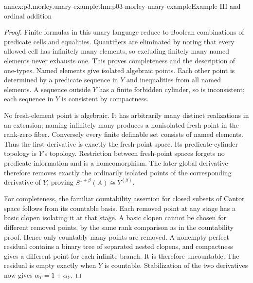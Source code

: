 \begin{annexitem}{annex:p3.morley.unary-example}{thm:p03-morley-unary-example}{Example III and ordinal addition}
\begin{proof}
Finite formulas in this unary language reduce to Boolean
combinations of predicate cells and equalities. Quantifiers
are eliminated by noting that every allowed cell has
infinitely many elements, so excluding finitely many
named elements never exhausts one. This proves completeness
and the description of one-types. Named elements give
isolated algebraic points. Each other point is determined
by a predicate sequence in \(Y\) and inequalities from
all named elements. A sequence outside \(Y\) has a
finite forbidden cylinder, so is inconsistent; each
sequence in \(Y\) is consistent by compactness.

No fresh-element point is algebraic. It has arbitrarily
many distinct realizations in an extension; naming
infinitely many produces a nonisolated fresh point in
the rank-zero fiber. Conversely every finite definable
set consists of named elements. Thus the first
derivative is exactly the fresh-point space. Its
predicate-cylinder topology is \(Y\)'s topology.
Restriction between fresh-point spaces forgets no
predicate information and is a homeomorphism. The
later global derivative therefore removes exactly
the ordinarily isolated points of the corresponding
derivative of \(Y\), proving
\(S^{1+\beta}(A)\cong Y^{(\beta)}\).

For completeness, the familiar countability assertion
for closed subsets of Cantor space follows from its
countable basis. Each removed point at any stage has
a basic clopen isolating it at that stage. A basic
clopen cannot be chosen for different removed points,
by the same rank comparison as in the countability
proof. Hence only countably many points are removed.
A nonempty perfect residual contains a binary tree
of separated nested clopens, and compactness gives
a different point for each infinite branch. It is
therefore uncountable. The residual is empty exactly
when \(Y\) is countable. Stabilization of the two
derivatives now gives \(\alpha_T=1+\alpha_Y\).
\end{proof}
\end{annexitem}
